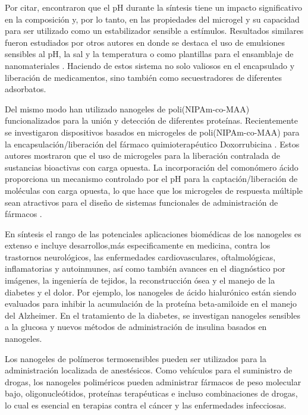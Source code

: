 Por citar, \citet{Brugger2008} encontraron que el pH durante la s\'intesis tiene un impacto significativo en la composici\'on y, por lo tanto, en las propiedades del microgel y su capacidad para ser utilizado como un estabilizador sensible a est\'imulos.
Resultados similares fueron estudiados por otros autores en donde se destaca el uso de emulsiones sensibles al pH, la sal y la temperatura  \cite{Ngai2005,Ngai2006, Schmidt2011} o como plantillas para el ensamblaje de nanomateriales \cite{Wong2009}.
Haciendo de estos sistema no solo valiosos en el encapsulado y liberaci\'on de medicamentos, sino también como secuestradores de diferentes adsorbatos.

Del mismo modo \citet{Culver2017A}han utilizado nanogeles de poli(NIPAm-co-MAA) funcionalizados para la uni\'on y detecci\'on de diferentes prote\'inas. 
Recientemente se investigaron dispositivos basados en microgeles de poli(NIPAm-co-MAA) para la encapsulación/liberaci\'on del f\'armaco quimioterap\'eutico Doxorrubicina \cite{Giussi2020, MartinezMoro2020, Pergushov2020}. Estos autores mostraron que el uso de microgeles para la liberaci\'on contralada de sustancias bioactivas con carga opuesta. 
La incorporaci\'on del comon\'omero \'acido proporciona un mecanismo controlado por el pH para la captaci\'on/liberaci\'on de mol\'eculas con carga opuesta, lo que hace que los microgeles de respuesta m\'ultiple sean atractivos para el dise\~no de sistemas funcionales de administraci\'on de f\'armacos \cite{Liu2017}.

En s\'intesis el  rango de las potenciales aplicaciones biom\'edicas de los nanogeles es extenso e incluye desarrollos,m\'as especificamente en medicina, contra los trastornos neurol\'ogicos, las enfermedades cardiovasculares, oftalmol\'ogicas, inflamatorias y autoinmunes, as\'i como tambi\'en avances en el diagn\'ostico por im\'agenes, la ingenier\'ia de tejidos, la reconstrucci\'on \'osea y el manejo de la diabetes y el dolor. Por ejemplo, los nanogeles de \'acido hialur\'onico est\'an siendo evaluados para inhibir la acumulaci\'on de la prote\'ina beta-amiloide en el manejo del Alzheimer. En el tratamiento de la diabetes, se investigan nanogeles sensibles a la glucosa y nuevos m\'etodos de administraci\'on de insulina basados en nanogeles.

Los nanogeles de pol\'imeros termosensibles pueden ser utilizados para la administraci\'on localizada de anest\'esicos. Como veh\'iculos para el suministro de drogas, los nanogeles polim\'ericos pueden administrar f\'armacos de peso molecular bajo, oligonucle\'otidos, prote\'inas terap\'euticas e incluso combinaciones de drogas, lo cual es esencial en terapias contra el c\'ancer y las enfermedades infecciosas.

